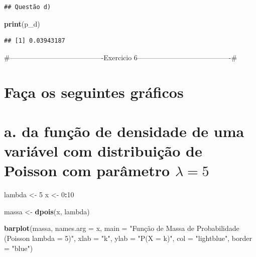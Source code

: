 \documentclass[
]{article}
\newenvironment{Shaded}{\begin{snugshade}}{\end{snugshade}}
\newcommand{\AttributeTok}[1]{\textcolor[rgb]{0.13,0.29,0.53}{#1}}
\newcommand{\DecValTok}[1]{\textcolor[rgb]{0.00,0.00,0.81}{#1}}
\newcommand{\FunctionTok}[1]{\textcolor[rgb]{0.13,0.29,0.53}{\textbf{#1}}}
\newcommand{\NormalTok}[1]{#1}
\newcommand{\OtherTok}[1]{\textcolor[rgb]{0.56,0.35,0.01}{#1}}
\newcommand{\SpecialCharTok}[1]{\textcolor[rgb]{0.81,0.36,0.00}{\textbf{#1}}}
\newcommand{\StringTok}[1]{\textcolor[rgb]{0.31,0.60,0.02}{#1}}
\begin{document}
\begin{verbatim}
## Questão d)
\end{verbatim}

\begin{Shaded}
\begin{Highlighting}[]
\FunctionTok{print}\NormalTok{(p\_d)}
\end{Highlighting}
\end{Shaded}

\begin{verbatim}
## [1] 0.03943187
\end{verbatim}

\#----------------------------------------Exercicio
6----------------------------------------\#

\section{Faça os seguintes
gráficos}\label{fauxe7a-os-seguintes-gruxe1ficos}

\section{\texorpdfstring{a. da função de densidade de uma variável com
distribuição de Poisson com parâmetro
\(\lambda=5\)}{a. da função de densidade de uma variável com distribuição de Poisson com parâmetro \textbackslash lambda=5}}\label{a.-da-funuxe7uxe3o-de-densidade-de-uma-variuxe1vel-com-distribuiuxe7uxe3o-de-poisson-com-paruxe2metro-lambda5}

\begin{Shaded}
\begin{Highlighting}[]
\NormalTok{lambda }\OtherTok{\textless{}{-}} \DecValTok{5}
\NormalTok{x }\OtherTok{\textless{}{-}} \DecValTok{0}\SpecialCharTok{:}\DecValTok{10}

\NormalTok{massa }\OtherTok{\textless{}{-}} \FunctionTok{dpois}\NormalTok{(x, lambda)}

\FunctionTok{barplot}\NormalTok{(massa, }\AttributeTok{names.arg =}\NormalTok{ x,}
        \AttributeTok{main =} \StringTok{"Função de Massa de Probabilidade (Poisson lambda = 5)"}\NormalTok{,}
        \AttributeTok{xlab =} \StringTok{"k"}\NormalTok{, }\AttributeTok{ylab =} \StringTok{"P(X = k)"}\NormalTok{,}
        \AttributeTok{col =} \StringTok{"lightblue"}\NormalTok{, }\AttributeTok{border =} \StringTok{"blue"}\NormalTok{)}
\end{Highlighting}
\end{Shaded}
\end{document}
